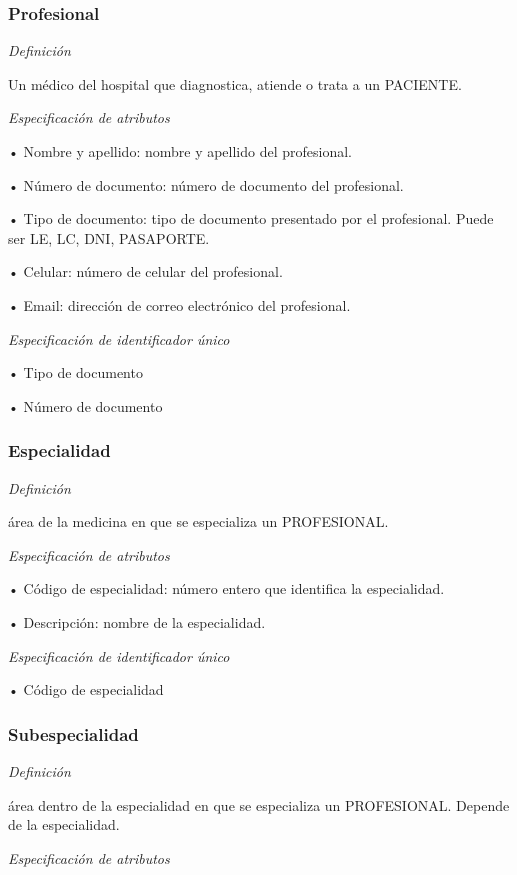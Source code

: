 \documentclass[a4paper,11pt]{article}
\begin{document}
\subsubsection{\textbf{Profesional}}

\textit{Definición}

Un médico del hospital que diagnostica, atiende o trata a un PACIENTE.

\textit{Especificación de atributos}

• Nombre y apellido: nombre y apellido del profesional.

• Número de documento: número de documento del profesional.

• Tipo de documento: tipo de documento presentado por el profesional. Puede ser 
LE, LC, DNI, PASAPORTE.

• Celular: número de celular del profesional.

• Email: dirección de correo electrónico del profesional.

\textit{Especificación de identificador único}

• Tipo de documento

• Número de documento\label{HToc293405809}

\subsubsection{\textbf{Especialidad}}

\textit{Definición}

área de la medicina en que se especializa un PROFESIONAL.

\textit{Especificación de atributos}

• Código de especialidad: número entero que identifica la especialidad.

• Descripción: nombre de la especialidad.

\textit{Especificación de identificador único}

• Código de especialidad\label{HToc293405810}

\subsubsection{\textbf{Subespecialidad}}

\textit{Definición}

área dentro de la especialidad en que se especializa un PROFESIONAL. Depende de 
la especialidad.

\textit{Especificación de atributos}
\end{document}
